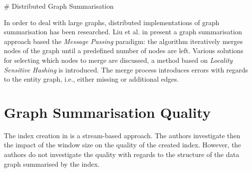 \# Distributed Graph Summarisation

In order to deal with large graphs, distributed implementations of graph summarisation has been researched.
Liu et al. in \cite{liu:cikm:2014} present a graph summarisation approach based the \emph{Message Passing} paradigm: the algorithm iteratively merges nodes of the graph until a predefined number of nodes are left. Various solutions for selecting which nodes to merge are discussed, a method based on \emph{Locality Sensitive Hashing} is introduced. The merge process introduces errors with regards to the entity graph, i.e., either missing or additional edges.

\section{Graph Summarisation Quality}

The index creation in \cite{konrath:jws:2012} is a stream-based approach. The authors investigate then the impact of the window size on the quality of the created index. However, the authors do not investigate the quality with regards to the structure of the data graph summarised by the index.
